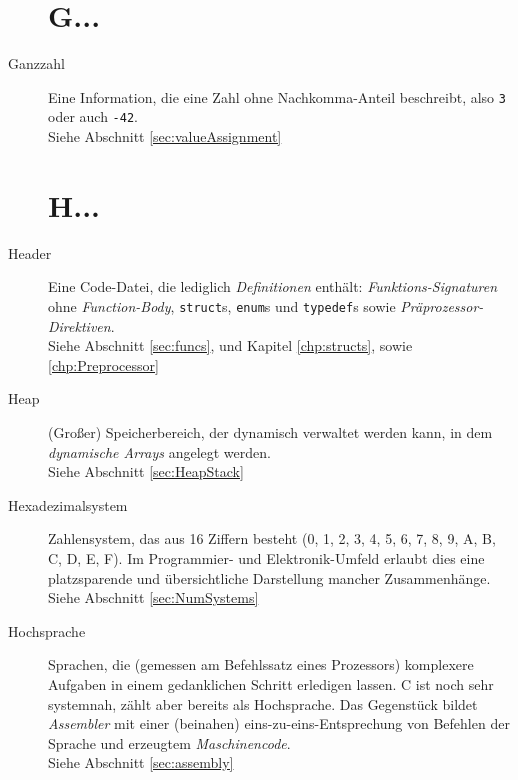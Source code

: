 \begin{appendices}
\begin{description}
\section*{G...}
\item[Ganzzahl] Eine Information, die eine Zahl ohne Nachkomma-Anteil beschreibt, also \eg
	\texttt{3} oder auch \texttt{-42}.\\
	Siehe Abschnitt \ref{sec:valueAssignment}

\section*{H...}
\item[Header] Eine Code-Datei, die lediglich \emph{Definitionen} enthält: \emph{Funktions-Signaturen}
	ohne \emph{Function-Body}, \texttt{struct}s, \texttt{enum}s und 
	\texttt{typedef}s sowie \emph{Präprozessor-Direktiven}.\\
	Siehe Abschnitt \ref{sec:funcs}, und Kapitel \ref{chp:structs}, sowie \ref{chp:Preprocessor}
\item[Heap] (Großer) Speicherbereich, der dynamisch verwaltet werden kann, \ie in dem \ua
	\emph{dynamische Arrays} angelegt werden.\\
	Siehe Abschnitt \ref{sec:HeapStack}
\item[Hexadezimalsystem] Zahlensystem, das aus 16 Ziffern besteht (0, 1, 2, 3, 4, 5, 6, 7, 8, 9, A, B,
	C, D, E, F). Im Programmier- und Elektronik-Umfeld erlaubt dies eine platzsparende und
	übersichtliche Darstellung mancher Zusammenhänge.\newline
	Siehe Abschnitt \ref{sec:NumSystems}
\item[Hochsprache] Sprachen, die (gemessen am Befehlssatz eines Prozessors) komplexere Aufgaben in
	einem gedanklichen Schritt erledigen lassen. C ist noch sehr systemnah, zählt aber bereits als
	Hochsprache. Das Gegenstück bildet \emph{Assembler} mit einer (beinahen) eins-zu-eins-Entsprechung
	von Befehlen der Sprache und erzeugtem \emph{Maschinencode}.\\
	Siehe Abschnitt \ref{sec:assembly}


\end{description}
\end{appendices}
